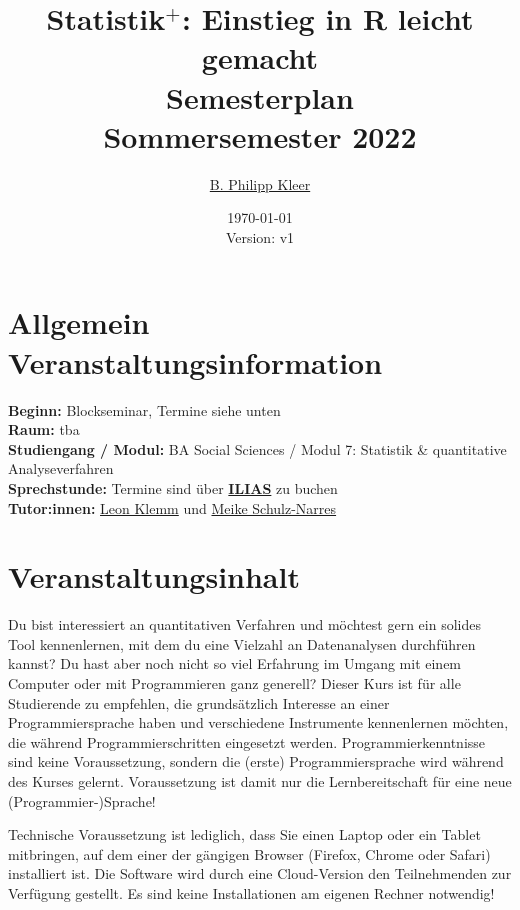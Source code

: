 \documentclass[11pt,a4paper]{article}
\author{\href{mailto:philipp.kleer@sowi.uni-giessen.de}{B. Philipp Kleer}}
\title{%
  Statistik$^+$: Einstieg in R leicht gemacht\\
  \large Semesterplan \\
  Sommersemester 2022}
\date{\today \\ \small{Version: v1}}
\begin{document}
\maketitle

\section*{Allgemein Veranstaltungsinformation}
\textbf{Beginn:} Blockseminar, Termine siehe unten\\
\textbf{Raum:} tba \\
\textbf{Studiengang / Modul:} BA Social Sciences / Modul 7: Statistik \& quantitative Analyseverfahren\\
\textbf{Sprechstunde:} Termine sind über \href{https://ilias.uni-giessen.de/ilias/goto.php?target=prtf_415969_35654&client_id=JLUG}{\textbf{ILIAS}} zu buchen\\
\textbf{Tutor:innen:} \href{mailto:Leon.P.Klemm@sowi.uni-giessen.de}{Leon Klemm} und \href{mailto:meike.schulz-narres@agrar.uni-giessen.de}{Meike Schulz-Narres}

\section*{Veranstaltungsinhalt}
Du bist interessiert an quantitativen Verfahren und möchtest gern ein solides Tool kennenlernen, mit dem du eine Vielzahl an Datenanalysen durchführen kannst? Du hast aber noch nicht so viel Erfahrung im Umgang mit einem Computer oder mit Programmieren ganz generell? Dieser Kurs ist für alle Studierende zu empfehlen, die grundsätzlich Interesse an einer Programmiersprache haben und verschiedene Instrumente kennenlernen möchten, die während Programmierschritten eingesetzt werden. Programmierkenntnisse sind keine Voraussetzung, sondern die (erste) Programmiersprache wird während des Kurses gelernt. Voraussetzung ist damit nur die Lernbereitschaft für eine neue (Programmier-)Sprache!

Technische Voraussetzung ist lediglich, dass Sie einen Laptop oder ein Tablet mitbringen, auf dem einer der gängigen Browser (Firefox, Chrome oder Safari) installiert ist. Die Software wird durch eine Cloud-Version den Teilnehmenden zur Verfügung gestellt. Es sind keine Installationen am eigenen Rechner notwendig!
\end{document}
